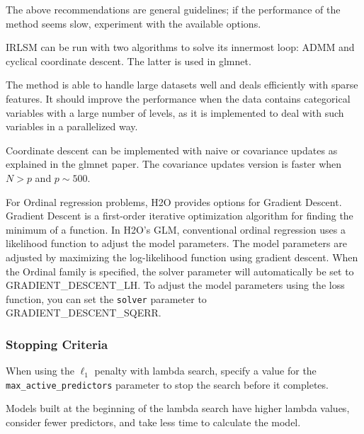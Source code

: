  The above recommendations are general guidelines; if the performance of the method seems slow, experiment with the available options. 

IRLSM can be run with two algorithms to solve its innermost loop: ADMM and cyclical coordinate descent. The latter is used in glmnet. 

The method is able to handle large datasets well and deals efficiently with sparse features. It should improve the performance when the data contains categorical variables with a large number of levels, as it is implemented to deal with such variables in a parallelized way. 

Coordinate descent can be implemented with naive or covariance updates as explained in the glmnet paper. The covariance updates version is faster when $N>p$ and $p \sim 500$. 

For Ordinal regression problems, H2O provides options for Gradient Descent. Gradient Descent is a first-order iterative optimization algorithm for finding the minimum of a function. In H2O's GLM, conventional ordinal regression uses a likelihood function to adjust the model parameters. The model parameters are adjusted by maximizing the log-likelihood function using gradient descent. When the Ordinal family is specified, the solver parameter will automatically be set to GRADIENT\_DESCENT\_LH. To adjust the model parameters using the loss function, you can set the \texttt{solver} parameter to GRADIENT\_DESCENT\_SQERR.

\subsubsection{Stopping Criteria}

When using the $\ell_1$ penalty with lambda search, specify a value for the \\ \texttt{max\_active\_predictors} parameter to stop the search before it completes.  

Models built at the beginning of the lambda search have higher lambda values, consider fewer predictors, and take less time to calculate the model. 

